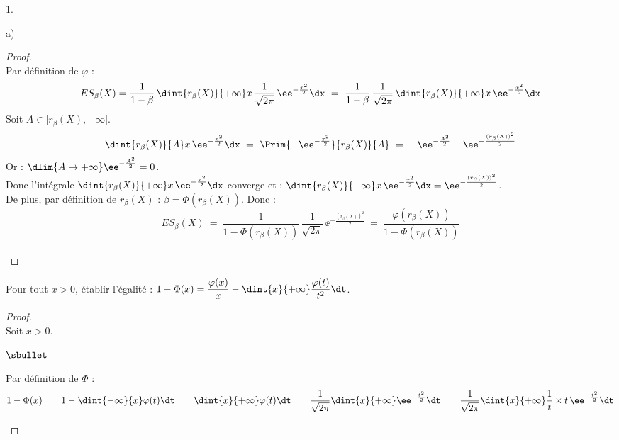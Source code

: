 \documentclass[11pt]{article}%
\begin{document}
\begin{noliste}{1.}
\begin{noliste}{a)}
    \begin{proof}~\\
      Par définition de $\varphi$ :
      \[
        ES_\beta(X) = \dfrac{1}{1-\beta} \, \dint{r_\beta(X)}
        {+\infty} x \, \dfrac{1}{\sqrt{2 \pi}} \, \ee^{-\frac{x^2}{2}}
        \dx \ = \ \dfrac{1}{1-\beta} \, \dfrac{1}{\sqrt{2 \pi}} \,
        \dint{r_\beta(X)}{+\infty} x \, \ee^{-\frac{x^2}{2}} \dx
      \]
      Soit $A \in [r_\beta(X), +\infty[$.
      \[
        \dint{r_\beta(X)}{A} x\, \ee^{-\frac{x^2}{2}} \dx \ = \
          \Prim{-\ee^{-\frac{x^2}{2}}}{r_\beta(X)}{A}
          \ = \ -\ee^{-\frac{A^2}{2}} + \ee^{-\frac{(r_\beta(X))^2}{2}}
      \]
      Or : $\dlim{A \to +\infty} \ee^{-\frac{A^2}{2}} =
      0$.\\
      Donc l'intégrale $\dint{r_\beta(X)}{+\infty} x \, 
      \ee^{-\frac{x^2}{2}} \dx$ converge et : 
      $\dint{r_\beta(X)}{+\infty} x \, \ee^{-\frac{x^2}{2}} \dx = 
      \ee^{-\frac{(r_\beta(X))^2}{2}}$.\\
      De plus, par définition de $r_\beta(X)$ : $\beta = 
      \Phi(r_\beta(X))$. Donc :
      \[
        ES_\beta(X) \ = \ \dfrac{1}{1-\Phi(r_\beta(X))} \, 
        \dfrac{1}{\sqrt{2 \pi}} \, \ee^{-\frac{(r_\beta(X))^2}{2}}
        \ = \ \dfrac{\varphi(r_\beta(X))}{1-\Phi(r_\beta(X))}
      \]
      ~\\[-1cm]
    \end{proof}
    
    \item Pour tout $x >0$, établir l'égalité : $1-\Phi(x)=
    \dfrac{\varphi(x)}{x}-\dint{x}{+\infty} \dfrac{\varphi(t)}{t^2} 
    \dt$.
    
    \begin{proof}~\\
      Soit $x>0$.
      \begin{noliste}{$\sbullet$}
	\item Par définition de $\Phi$ :
	\[
	  1-\Phi(x) \ = \ 1- \dint{-\infty}{x} \varphi(t) \dt
	  \ = \ \dint{x}{+\infty} \varphi(t) \dt \ = \
	  \dfrac{1}{\sqrt{2 \pi}} \dint{x}{+\infty} 
	  \ee^{-\frac{t^2}{2}} \dt \ = \ \dfrac{1}{\sqrt{2 \pi}}
	  \dint{x}{+\infty} \dfrac{1}{t} \times t \, 
	  \ee^{-\frac{t^2}{2}} \dt
	\]
	

\end{noliste}
\end{proof}
\end{noliste}
\end{noliste}
\end{document}
